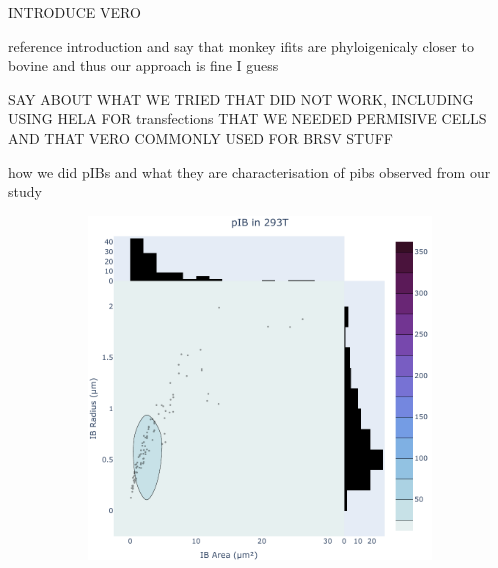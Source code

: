 INTRODUCE VERO \cite{Simizu1967CharacterizationVero}

reference introduction and say that monkey ifits are phyloigenicaly closer to bovine and thus our approach is fine I guess

SAY ABOUT WHAT WE TRIED THAT DID NOT WORK, INCLUDING USING HELA FOR transfections
THAT WE NEEDED PERMISIVE CELLS AND THAT VERO COMMONLY USED FOR BRSV STUFF

how we did pIBs and what they are
characterisation of pibs observed from our study

\begin{figure}
    \begin{subfigure}{0.495\textwidth}
        \caption{}
        \includegraphics[width=\textwidth]{09. Chapter 4/Figs/01. pIB/01. pIB characterisation/01. heatmap_pib-293t.pdf} 
    \end{subfigure}
    \hfill
    \begin{subfigure}{0.495\textwidth}
        \caption{}

\end{subfigure}
\end{figure}
